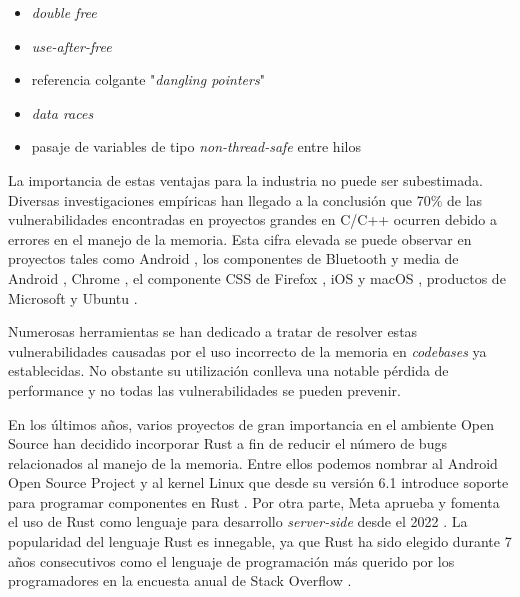 \documentclass[12pt]{article}
\begin{document}
\begin{itemize}
    \item \textit{double free} \cite{rust-book-ownership}
    \item \textit{use-after-free} \cite{rust-book-ownership}
    \item referencia colgante "\textit{dangling pointers}" \cite{rust-book-references}
    \item \textit{data races} \cite{rust-book-references}
    \item pasaje de variables de tipo \textit{non-thread-safe} entre hilos \cite{rust-book-extensible-concurrency}
\end{itemize}

La importancia de estas ventajas para la industria no puede ser subestimada.
Diversas investigaciones empíricas han llegado a la conclusión que 70\% de las vulnerabilidades
encontradas en proyectos grandes en C/C++ ocurren debido a errores en el manejo de la memoria.
Esta cifra elevada se puede observar en proyectos tales como Android \cite{memory-bugs-android},
los componentes de Bluetooth y media de Android \cite{memory-bugs-android-media-bluetooth},
Chrome \cite{memory-bugs-chrome}, el componente CSS de Firefox \cite{memory-bugs-firefox},
iOS y macOS \cite{memory-bugs-ios-macos}, productos de Microsoft \cite{miller-security-microsoft2019}\cite{memory-bugs-microsoft}
y Ubuntu \cite{memory-bugs-ubuntu}.

Numerosas herramientas se han dedicado a tratar de resolver estas vulnerabilidades causadas por el uso incorrecto de la memoria en \textit{codebases} ya establecidas.
No obstante su utilización conlleva una notable pérdida de performance y no todas las vulnerabilidades se pueden prevenir.\cite{szekeres2013}

En los últimos años, varios proyectos de gran importancia en el ambiente Open Source han decidido incorporar Rust
a fin de reducir el número de bugs relacionados al manejo de la memoria.
Entre ellos podemos nombrar al Android Open Source Project \cite{android-rust} y
al kernel Linux que desde su versión 6.1 introduce soporte para programar componentes en Rust \cite{infoq-linux-6.1-rust}\cite{lwn-linux-6.1-rust}.
Por otra parte, Meta aprueba y fomenta el uso de Rust como lenguaje para desarrollo \textit{server-side} desde el 2022 \cite{meta-rust-server-side}.
La popularidad del lenguaje Rust es innegable, ya que Rust ha sido elegido durante 7 años consecutivos
como el lenguaje de programación más querido por los programadores en la encuesta anual de Stack Overflow \cite{so-survey2022}.
\end{document}
